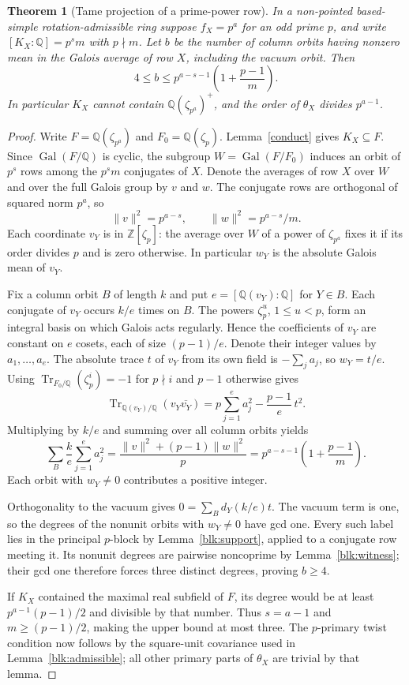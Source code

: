 \documentclass[11pt]{amsart}
\numberwithin{equation}{section}
\newtheorem{theorem}{Theorem}[section]
\theoremstyle{definition}
\theoremstyle{plain}
\newcommand{\QQ}{\mathbb Q}
\newcommand{\ZZ}{\mathbb Z}
\begin{document}
\begin{theorem}[Tame projection of a prime-power row]\label{thm:tame-orbit}
In a non-pointed based-simple rotation-admissible ring suppose
$f_X=p^a$ for an odd prime $p$, and write
$[K_X:\QQ]=p^s m$ with $p\nmid m$. Let $b$ be the number of
column orbits having nonzero mean in the Galois average of row $X$,
including the vacuum orbit. Then
\[
 4\le b\le p^{a-s-1}\left(1+\frac{p-1}{m}\right).
\]
In particular $K_X$ cannot contain $\QQ(\zeta_{p^a})^+$,
and the order of $\theta_X$ divides $p^{a-1}$.
\end{theorem}
\begin{proof}
Write $F=\QQ(\zeta_{p^a})$ and $F_0=\QQ(\zeta_p)$.
Lemma~\ref{conduct} gives $K_X\subseteq F$.
Since $\operatorname{Gal}(F/\QQ)$ is cyclic, the subgroup
$W=\operatorname{Gal}(F/F_0)$ induces an orbit of $p^s$ rows
among the $p^s m$ conjugates of $X$. Denote the averages of row
$X$ over $W$ and over the full Galois group by $v$ and $w$.
The conjugate rows are orthogonal of squared norm $p^a$, so
\[
 \|v\|^2=p^{a-s},\qquad \|w\|^2=p^{a-s}/m.
\]
Each coordinate $v_Y$ is in $\ZZ[\zeta_p]$: the average over $W$ of
a power of $\zeta_{p^a}$ fixes it if its order divides $p$ and is zero
otherwise. In particular $w_Y$ is the absolute Galois mean of $v_Y$.

Fix a column orbit $B$ of length $k$ and put $e=[\QQ(v_Y):\QQ]$
for $Y\in B$. Each conjugate of $v_Y$ occurs $k/e$ times on $B$.
The powers $\zeta_p^u$, $1\le u<p$, form an integral basis on
which Galois acts regularly. Hence the coefficients of $v_Y$ are
constant on $e$ cosets, each of size $(p-1)/e$. Denote their
integer values by $a_1,\ldots,a_e$. The absolute trace $t$ of $v_Y$
from its own field is $-\sum_j a_j$, so $w_Y=t/e$.
Using $\operatorname{Tr}_{F_0/\QQ}(\zeta_p^i)=-1$ for
$p\nmid i$ and $p-1$ otherwise gives
\[
 \operatorname{Tr}_{\QQ(v_Y)/\QQ}(v_Y\overline{v_Y})
 =p\sum_{j=1}^e a_j^2-\frac{p-1}{e}\,t^2 .
\]
Multiplying by $k/e$ and summing over all column orbits yields
\[
 \sum_B \frac{k}{e}\sum_{j=1}^e a_j^2
 =\frac{\|v\|^2+(p-1)\|w\|^2}{p}
 =p^{a-s-1}\left(1+\frac{p-1}{m}\right).
\]
Each orbit with $w_Y\ne0$ contributes a positive integer.

Orthogonality to the vacuum gives
$0=\sum_B d_Y(k/e)t$. The vacuum term is one, so the degrees
of the nonunit orbits with $w_Y\ne0$ have gcd one.
Every such label lies in the principal $p$-block by
Lemma~\ref{blk:support}, applied to a conjugate row meeting it.
Its nonunit degrees are pairwise noncoprime by
Lemma~\ref{blk:witness}; their gcd one therefore forces three
distinct degrees, proving $b\ge4$.

If $K_X$ contained the maximal real subfield of $F$, its degree
would be at least $p^{a-1}(p-1)/2$ and divisible by that number.
Thus $s=a-1$ and $m\ge(p-1)/2$, making the upper bound at most
three. The $p$-primary twist condition now follows by the
square-unit covariance used in Lemma~\ref{blk:admissible};
all other primary parts of $\theta_X$ are trivial by that lemma.
\end{proof}
\end{document}
